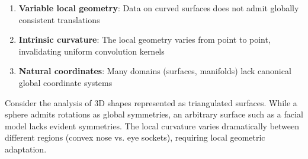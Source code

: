 \begin{enumerate}
    \item \textbf{Variable local geometry}: Data on curved surfaces does not admit globally consistent translations
    \item \textbf{Intrinsic curvature}: The local geometry varies from point to point, invalidating uniform convolution kernels
    \item \textbf{Natural coordinates}: Many domains (surfaces, manifolds) lack canonical global coordinate systems
\end{enumerate}

\begin{example}
Consider the analysis of 3D shapes represented as triangulated surfaces. While a sphere admits rotations as global symmetries, an arbitrary surface such as a facial model lacks evident symmetries. The local curvature varies dramatically between different regions (convex nose vs. eye sockets), requiring local geometric adaptation.
\end{example}

